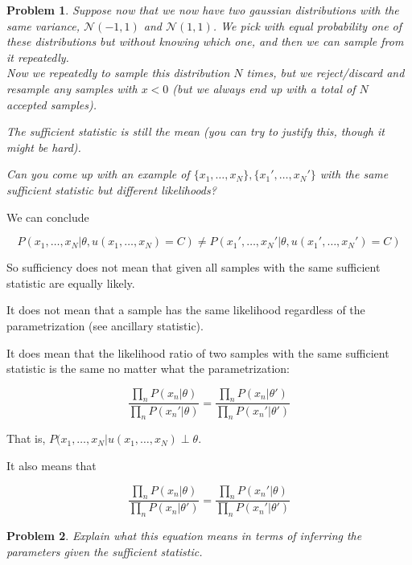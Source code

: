\documentclass[a4paper]{article}
\newtheorem{problem}{Problem}[section]
\begin{document}
\begin{problem}
  Suppose now that we now have two gaussian distributions with the same variance, $\mathcal{N}(-1,1)$ and $\mathcal{N}(1,1)$.  We pick with equal probability one of these distributions but without knowing which one, and then we can sample from it repeatedly. \\
Now we repeatedly to sample this distribution $N$ times, but we reject/discard and resample any samples with $x<0$ (but we always end up with a total of $N$ accepted samples).

The sufficient statistic is still the mean (you can try to justify this, though it might be hard).

Can you come up with an example of $\{x_1,\ldots,x_N\}, \{x_1',\ldots,x_N'\}$ with the same sufficient statistic but different likelihoods?
\end{problem}

We can conclude

\begin{equation}
  P( x_1, \ldots, x_N \vert \theta, u(x_1,\ldots,x_N) = C ) \neq P( x_1', \ldots, x_N' \vert \theta, u(x_1',\ldots,x_N') = C )
  \label{}
\end{equation}

So sufficiency does not mean that given all samples with the same sufficient statistic are equally likely.

It does not mean that a sample has the same likelihood regardless of the parametrization (see ancillary statistic).

It does mean that the likelihood ratio of two samples with the same sufficient statistic is the same no matter what the parametrization:

\begin{equation}
  \frac{\prod_n P(x_n \vert \theta) }{ \prod_n P( x_n' \vert \theta) } = \frac{\prod_n P( x_n \vert \theta') }{ \prod_n P( x_n' \vert \theta') }
  \label{}
\end{equation}

That is, $P( x_1, \ldots, x_N \vert u(x_1, \ldots, x_N) \perp \theta $.

It also means that 

\begin{equation}
  \frac{\prod_n P(x_n \vert \theta) }{ \prod_n P( x_n \vert \theta') } = \frac{\prod_n P( x_n' \vert \theta) }{ \prod_n P( x_n' \vert \theta') }
  \label{}
\end{equation}

\begin{problem}
Explain what this equation means in terms of inferring the parameters given the sufficient statistic.
\end{problem}
\end{document}
